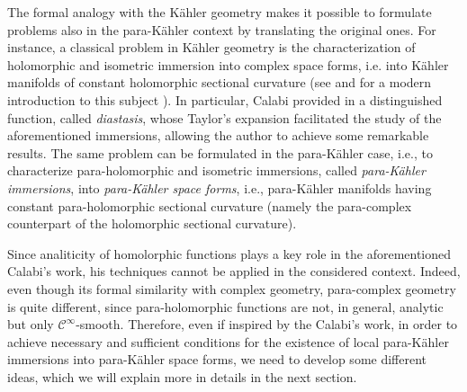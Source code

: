 \documentclass{article}
\newcommand{\pk}{para-K\"ahler }
\begin{document}
The formal analogy with the K\"ahler geometry makes it possible to formulate problems also in the \pk context by translating the original ones. For instance, a classical  problem in K\"ahler geometry is the characterization of holomorphic and isometric immersion  into complex space forms, i.e. into   K\"ahler  manifolds of constant holomorphic sectional curvature (see \cite{Cal} and for a modern introduction to this subject \cite{loizedda}).
In particular, Calabi provided in \cite{Cal} a distinguished function, called \emph{diastasis}, whose Taylor's expansion facilitated the study of the aforementioned immersions, allowing the author to achieve some remarkable results. The same problem can be formulated in the \pk case, i.e., to characterize para-holomorphic and isometric immersions, called \emph{\pk immersions},  into \emph{\pk space forms}, i.e., \pk manifolds having constant para-holomorphic sectional curvature (namely the para-complex counterpart of the holomorphic sectional curvature). 


Since analiticity of homolorphic functions plays a key role in the aforementioned Calabi's work, his techniques cannot be applied in the considered context. 
Indeed, even though its formal similarity with complex geometry, para-complex geometry is quite different, since para-holomorphic functions are not, in general, analytic but only $\mathcal{C}^\infty$-smooth. 
Therefore, even if inspired by the Calabi's work,  in order to achieve  necessary and sufficient conditions for the existence of local \pk immersions into \pk space forms,  we need to develop some different ideas, which we will explain more in details in the next section.


%
%
%
%
\end{document}
